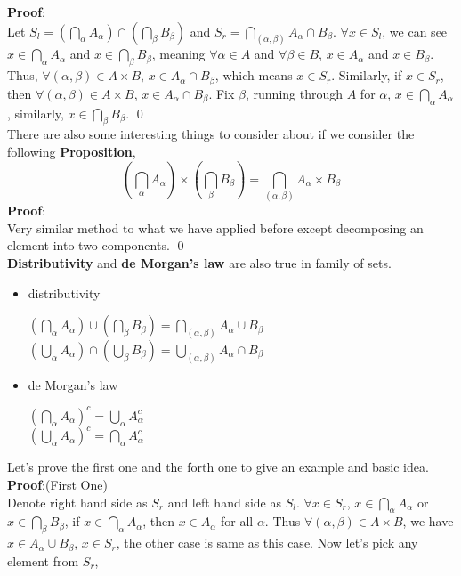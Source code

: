 \documentclass{article}
\begin{document}
\textbf{Proof}:\\Let
$S_{l} = (\bigcap_{\alpha}A_{\alpha}) \cap ( \bigcap_{\beta} B_{\beta})$ and $S_{r} = \bigcap_{(\alpha, \beta)} A_{\alpha} \cap B_{\beta}$. $\forall x \in S_{l}$, we can see $x \in \bigcap_{\alpha}A_{\alpha}$ and $x \in \bigcap_{\beta} B_{\beta}$, meaning
$\forall \alpha \in A$ and $\forall \beta \in B$, $x \in A_{\alpha}$ and $x \in B_{\beta}$. Thus, $\forall (\alpha, \beta) \in A\times B$, $x \in A_{\alpha} \cap B_{\beta}$, which means $x \in S_{r}$. Similarly, if $x \in S_{r}$, then $\forall (\alpha, \beta) \in A \times B$,
$x \in A_{\alpha}\cap B_{\beta}$. Fix $\beta$, running through $A$ for $\alpha$, $x \in \bigcap_{\alpha} A_{\alpha}$, similarly, $x \in \bigcap_{\beta} B_{\beta}$. \qed\\
There are also some interesting things to consider about if we consider the following \textbf{Proposition},
$$
\left(\bigcap_{\alpha}A_{\alpha}\right) \times \left( \bigcap_{\beta} B_{\beta}\right) = \bigcap_{(\alpha, \beta)} A_{\alpha} \times B_{\beta}
$$
\textbf{Proof}:\\
Very similar method to what we have applied before except decomposing an element into two components. \qed\\
\textbf{Distributivity} and \textbf{de Morgan's law} are also true in family of sets.
\begin{itemize}
    \item{distributivity}
    \begin{center}
        $(\bigcap_{\alpha}A_{\alpha}) \cup ( \bigcap_{\beta} B_{\beta}) = \bigcap_{(\alpha, \beta)} A_{\alpha} \cup B_{\beta}$\\
        $ (\bigcup_{\alpha}A_{\alpha}) \cap ( \bigcup_{\beta} B_{\beta}) = \bigcup_{(\alpha, \beta)} A_{\alpha} \cap B_{\beta}$
    \end{center}
    \item{de Morgan's law}
    \begin{center}
                        $(\bigcap_{\alpha}A_{\alpha})^c = \bigcup_{\alpha} A_{\alpha} ^ c$\\
                        $(\bigcup_{\alpha}A_{\alpha})^c = \bigcap_{\alpha} A_{\alpha} ^ c$
    \end{center}
\end{itemize}
Let's prove the first one and the forth one to give an example and basic idea.\\
\textbf{Proof}:(First One)\\
Denote right hand side as $S_r$ and left hand side as $S_l$. $\forall x \in S_r$, $x \in \bigcap_{\alpha} A_\alpha $ or $x \in \bigcap_\beta B_\beta$, if $x \in \bigcap_\alpha A_\alpha$, then $x \in A_\alpha$ for all $\alpha$.
Thus $\forall (\alpha, \beta) \in A \times B$, we have $x \in A_\alpha \cup B_\beta$, $x \in S_r$, the other case is same as this case. Now let's pick any element from $S_r$,
\newpage
\end{document}
